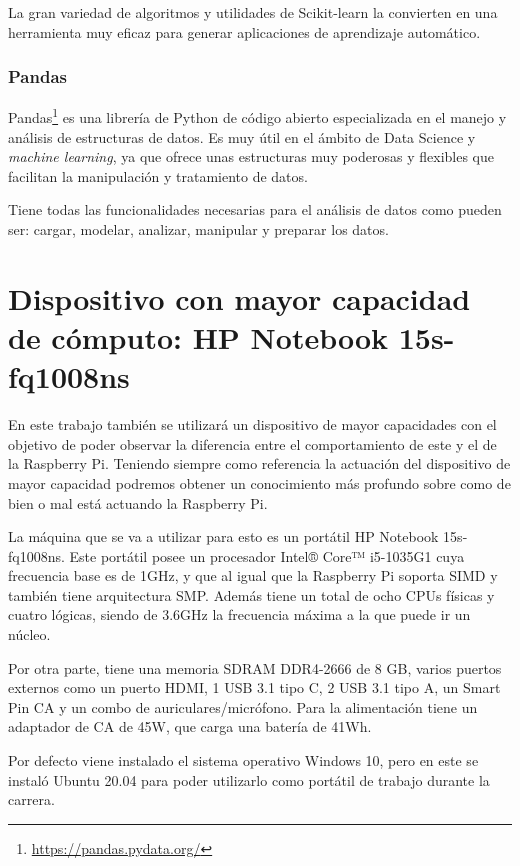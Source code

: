 \documentclass[a4paper, 12pt]{book}
\begin{document}
La gran variedad de algoritmos y utilidades de Scikit-learn la convierten en una herramienta muy eficaz para generar aplicaciones de aprendizaje automático.

\subsubsection{Pandas}
\label{subsubsec:Pandas}

Pandas\footnote{\url{https://pandas.pydata.org/}} es una librería de Python de código abierto especializada en el manejo y análisis de estructuras de datos. Es muy útil en el ámbito de Data Science y \textit{machine learning}, ya que ofrece unas estructuras muy poderosas y flexibles que facilitan la manipulación y tratamiento de datos.

Tiene todas las funcionalidades necesarias para el análisis de datos como pueden ser: cargar, modelar, analizar, manipular y preparar los datos.


\section{Dispositivo con mayor capacidad de cómputo: HP Notebook 15s-fq1008ns}
\label{sec:portatil}

En este trabajo también se utilizará un dispositivo de mayor capacidades con el objetivo de poder observar la diferencia entre el comportamiento de este y el de la Raspberry Pi. Teniendo siempre como referencia la actuación del dispositivo de mayor capacidad podremos obtener un conocimiento más profundo sobre como de bien o mal está actuando la Raspberry Pi. 

La máquina que se va a utilizar para esto es un portátil HP Notebook 15s-fq1008ns. Este portátil posee un procesador Intel® Core™ i5-1035G1 cuya frecuencia base es de 1GHz, y que al igual que la Raspberry Pi soporta SIMD y también tiene arquitectura SMP. Además tiene un total de ocho CPUs físicas y cuatro lógicas, siendo de 3.6GHz la frecuencia máxima a la que puede ir un núcleo. 

Por otra parte, tiene una memoria SDRAM DDR4-2666 de 8 GB, varios puertos externos como un puerto HDMI, 1 USB 3.1 tipo C, 2 USB 3.1 tipo A, un Smart Pin CA y un combo de auriculares/micrófono. Para la alimentación tiene un adaptador de CA de 45W, que carga una batería de 41Wh. 

Por defecto viene instalado el sistema operativo Windows 10, pero en este se instaló Ubuntu 20.04 para poder utilizarlo como portátil de trabajo durante la carrera. 
\end{document}
